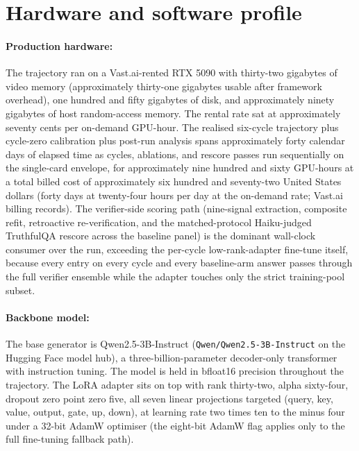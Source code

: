 \section{Hardware and software profile}
\label{app:hardware}

\paragraph{Production hardware:} The trajectory ran on a Vast.ai-rented RTX 5090 with thirty-two gigabytes of video memory (approximately thirty-one gigabytes usable after framework overhead), one hundred and fifty gigabytes of disk, and approximately ninety gigabytes of host random-access memory. The rental rate sat at approximately seventy cents per on-demand GPU-hour. The realised six-cycle trajectory plus cycle-zero calibration plus post-run analysis spans approximately forty calendar days of elapsed time as cycles, ablations, and rescore passes run sequentially on the single-card envelope, for approximately nine hundred and sixty GPU-hours at a total billed cost of approximately six hundred and seventy-two United States dollars (forty days at twenty-four hours per day at the on-demand rate; Vast.ai billing records). The verifier-side scoring path (nine-signal extraction, composite refit, retroactive re-verification, and the matched-protocol Haiku-judged TruthfulQA rescore across the baseline panel) is the dominant wall-clock consumer over the run, exceeding the per-cycle low-rank-adapter fine-tune itself, because every entry on every cycle and every baseline-arm answer passes through the full verifier ensemble while the adapter touches only the strict training-pool subset.

\paragraph{Backbone model:} The base generator is Qwen2.5-3B-Instruct (\verb|Qwen/Qwen2.5-3B-Instruct| on the Hugging Face model hub), a three-billion-parameter decoder-only transformer with instruction tuning. The model is held in bfloat16 precision throughout the trajectory. The LoRA adapter sits on top with rank thirty-two, alpha sixty-four, dropout zero point zero five, all seven linear projections targeted (query, key, value, output, gate, up, down), at learning rate two times ten to the minus four under a 32-bit AdamW optimiser (the eight-bit AdamW flag applies only to the full fine-tuning fallback path).

